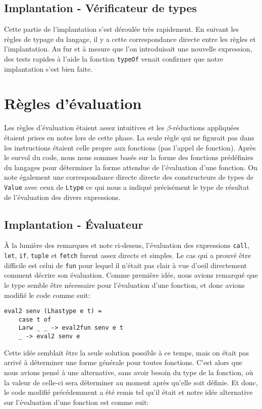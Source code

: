 \documentclass[11pt, titlepage]{article}
\begin{document}
\subsection{Implantation - Vérificateur de types}

Cette partie de l'implantation s'est déroulée très rapidement. En suivant les
règles de typage du langage, il y a cette correspondance directe entre les
règles et l'implantation. Au fur et à mesure que l'on introduisait une nouvelle
expression, des tests rapides à l'aide la fonction \texttt{typeOf} venait
confirmer que notre implantation s'est bien faite.

\section{Règles d'évaluation}

Les règles d'évaluation étaient assez intuitives et les \(\beta\)-réductions
appliquées étaient prises en notes lors de cette phase. La seule règle qui ne
figurait pas dans les instructions étaient celle propre aux fonctions (pas
l'appel de fonction). Après le survol du code, nous nous sommes basés sur la
forme des fonctions prédéfinies du langages pour déterminer la forme attendue
de l'évaluation d'une fonction. On note également une correspondance directe
directe des constructeurs de types de \texttt{Value} avec ceux de
\texttt{Ltype} ce qui nous a indiqué précisément le type de résultat de
l'évaluation des divers expressions.

\subsection{Implantation - Évaluateur}

À la lumière des remarques et note ci-dessus, l'évaluation des expressions
\texttt{call}, \texttt{let}, \texttt{if}, \texttt{tuple} et \texttt{fetch}
furent assez directs et simples. Le cas qui a prouvé être difficile est celui
de \texttt{fun} pour lequel il n'était pas clair à vue d'oeil directement
comment décrire son évaluation. Comme première idée, nous avions remarqué que
le type semble être nécessaire pour l'évaluation d'une fonction, et donc avions
modifié le code comme suit:

\begin{lstlisting}
eval2 senv (Lhastype e t) =
    case t of
    Larw _ _ -> eval2fun senv e t
    _ -> eval2 senv e
\end{lstlisting}

Cette idée semblait être la seule solution possible à ce temps, mais on était
pas arrivé à déterminer une forme générale pour toutes fonctions. C'est alors
que nous avions pensé à une alternative, sans avoir besoin du type de la
fonction, où la valeur de celle-ci sera déterminer au moment après qu'elle soit
définie. Et donc, le code modifié précédemment a été remis tel qu'il était
et notre idée alternative sur l'évaluation d'une fonction est comme suit:
\end{document}
